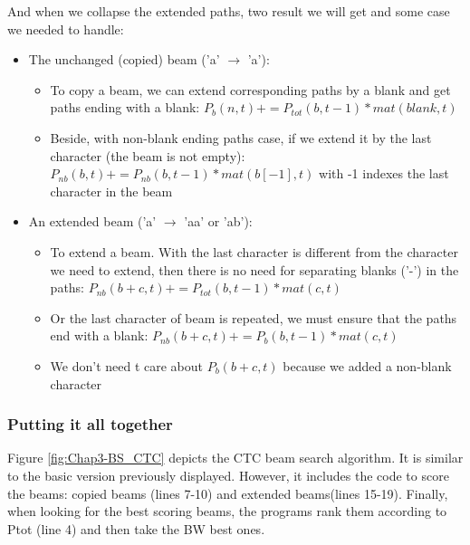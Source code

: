 And when we collapse the extended paths, two result we will get and some case we needed to handle:
\begin{itemize}
	\item The unchanged (copied) beam ('a' $ \rightarrow $ 'a'):
	      \begin{itemize}
		      \item To copy a beam, we can extend corresponding paths by a blank and get
		            paths ending with a blank: $ P_b (n, t) += P_{tot}(b, t-1)*mat(blank, t) $
		      \item Beside, with non-blank ending paths case, if we extend it by the last
		            character (the beam is not empty): $ P_{nb}(b,t) += P_{nb}(b,t-1)*mat(b[-1],t) $
		            with -1 indexes the last character in the beam
	      \end{itemize}
	\item An extended beam ('a' $\rightarrow$ 'aa' or 'ab'):
	      \begin{itemize}
		      \item To extend a beam. With the last character is different from the character we need
		            to extend, then there is no need for separating blanks ('-') in the paths:
		            $ P_{nb}(b+c,t) += P_{tot}(b,t-1)*mat(c,t) $
		      \item Or the last character of beam is repeated, we must ensure that the paths
		            end with a blank: $ P_{nb}(b+c,t) += P_b(b,t-1)*mat(c,t) $
		      \item We don't need t care about $P_b(b+c,t)$ because we added a non-blank character
	      \end{itemize}
\end{itemize}

\subsubsection{Putting it all together}

Figure \ref{fig:Chap3-BS_CTC} depicts the CTC beam search algorithm. It is similar to the basic version previously displayed. However, it includes the code to score the beams: copied beams (lines 7-10) and extended beams(lines 15-19). Finally, when looking for the best scoring beams, the programs rank them according to Ptot (line 4) and then take the BW best ones.

